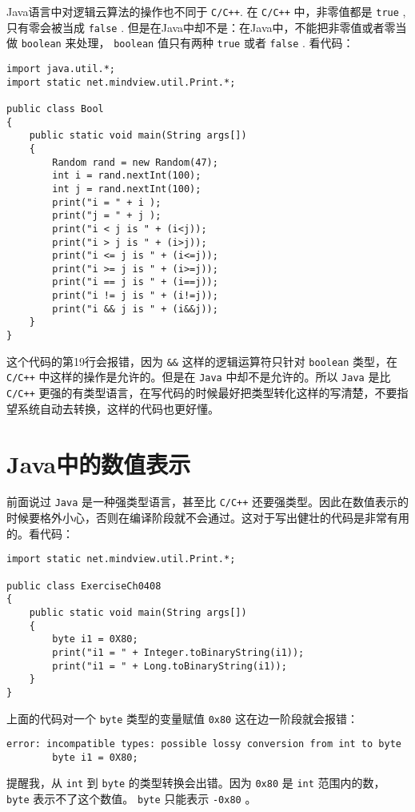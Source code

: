 \documentclass[10pt,a4paper,UTF8]{article}
\begin{document}
Java语言中对逻辑云算法的操作也不同于 \texttt{C/C++}. 在 \texttt{C/C++} 中，非零值都是 \texttt{true} ,只有零会被当成 \texttt{false} . 但是在Java中却不是：在Java中，不能把非零值或者零当做 \texttt{boolean} 来处理， \texttt{boolean} 值只有两种 \texttt{true} 或者 \texttt{false} . 看代码：
\lstset{language=java,label= ,caption= ,captionpos=b,firstnumber=1,numbers=left}
\begin{lstlisting}
import java.util.*;
import static net.mindview.util.Print.*;

public class Bool
{
    public static void main(String args[])
    {
        Random rand = new Random(47);
        int i = rand.nextInt(100);
        int j = rand.nextInt(100);
        print("i = " + i );
        print("j = " + j );
        print("i < j is " + (i<j));
        print("i > j is " + (i>j));
        print("i <= j is " + (i<=j));
        print("i >= j is " + (i>=j));
        print("i == j is " + (i==j));
        print("i != j is " + (i!=j));
        print("i && j is " + (i&&j));
    }
}
\end{lstlisting}
这个代码的第19行会报错，因为 \texttt{\&\&} 这样的逻辑运算符只针对 \texttt{boolean} 类型，在 \texttt{C/C++} 中这样的操作是允许的。但是在 \texttt{Java} 中却不是允许的。所以 \texttt{Java}  是比 \texttt{C/C++} 更强的有类型语言，在写代码的时候最好把类型转化这样的写清楚，不要指望系统自动去转换，这样的代码也更好懂。
\section{Java中的数值表示}
\label{sec:orgheadline5}


前面说过 \texttt{Java} 是一种强类型语言，甚至比 \texttt{C/C++} 还要强类型。因此在数值表示的时候要格外小心，否则在编译阶段就不会通过。这对于写出健壮的代码是非常有用的。看代码：
\lstset{language=java,label= ,caption= ,captionpos=b,firstnumber=1,numbers=left}
\begin{lstlisting}
import static net.mindview.util.Print.*;

public class ExerciseCh0408
{
    public static void main(String args[])
    {
        byte i1 = 0X80;
        print("i1 = " + Integer.toBinaryString(i1));
        print("i1 = " + Long.toBinaryString(i1));
    }
}
\end{lstlisting}
上面的代码对一个 \texttt{byte} 类型的变量赋值 \texttt{0x80} 这在边一阶段就会报错：
\begin{verbatim}
error: incompatible types: possible lossy conversion from int to byte
        byte i1 = 0X80;
\end{verbatim}
提醒我，从 \texttt{int} 到 \texttt{byte} 的类型转换会出错。因为 \texttt{0x80} 是 \texttt{int} 范围内的数， \texttt{byte} 表示不了这个数值。 \texttt{byte} 只能表示 \texttt{-0x80} 。
\end{document}

